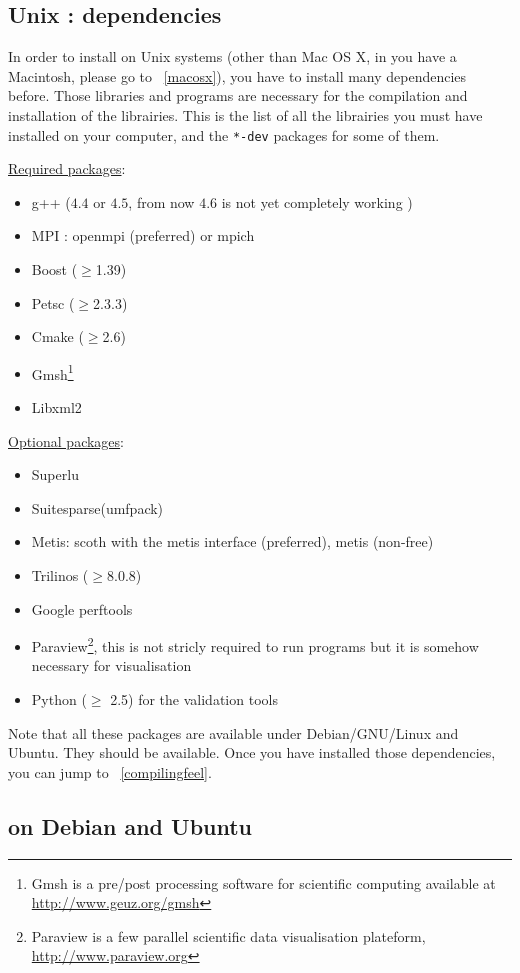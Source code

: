 \subsection{Unix : dependencies}
\label{sec:about-dependencies}

In order to install \feel on Unix systems (other than Mac OS X, in you have a Macintosh, please go to ~\ref{macosx}), you have to install many dependencies
before. Those libraries and programs are necessary for the
compilation and installation of the \feel librairies.
This is the list of all the librairies you must have installed on your
computer, and the \verb|*-dev| packages for some of them.

\underline{Required packages}:
\begin{itemize}
\item g++ ($4.4$ or $4.5$, from now $4.6$ is not yet	completely working  )
\item MPI : openmpi (preferred) or mpich
\item Boost ($\geq$1.39)
\item Petsc ($\geq$2.3.3)
\item Cmake ($\geq$2.6)
\item Gmsh\footnote{Gmsh is a pre/post processing software for scientific
computing available at \url{http://www.geuz.org/gmsh}}
\item Libxml2
\end{itemize}
\underline{Optional packages}:
\begin{itemize}
\item Superlu
\item Suitesparse(umfpack)
\item Metis: scoth with the metis interface (preferred), metis (non-free)
\item Trilinos ($\geq$8.0.8)
\item Google perftools
\item Paraview\footnote{Paraview is a few parallel scientific data
    visualisation plateform, \url{http://www.paraview.org}}, this is
  not stricly required to run \feel programs but it is somehow
  necessary for visualisation
\item Python ($\geq$ 2.5) for the validation tools
\end{itemize}
Note that all these packages are available under Debian/GNU/Linux and
Ubuntu. They should be available. Once you have installed those dependencies, you can jump to ~\ref{compilingfeel}.

\subsection{\feel on Debian and Ubuntu}
\label{sec:feel-debian-ubuntu}

